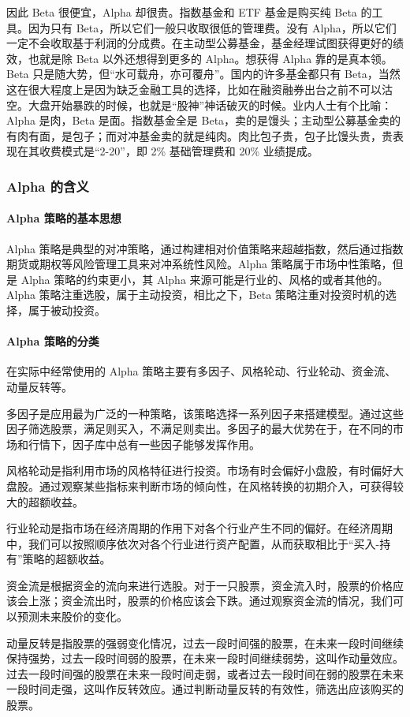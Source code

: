 因此 Beta 很便宜，Alpha 却很贵。指数基金和 ETF 基金是购买纯 Beta 的工具。因为只有 Beta，所以它们一般只收取很低的管理费。没有 Alpha，所以它们一定不会收取基于利润的分成费。在主动型公募基金，基金经理试图获得更好的绩效，也就是除 Beta 以外还想得到更多的 Alpha。想获得 Alpha 靠的是真本领。Beta 只是随大势，但“水可载舟，亦可覆舟”。国内的许多基金都只有 Beta，当然这在很大程度上是因为缺乏金融工具的选择，比如在融资融券出台之前不可以沽空。大盘开始暴跌的时候，也就是“股神”神话破灭的时候。业内人士有个比喻：Alpha 是肉，Beta 是面。指数基金全是 Beta，卖的是馒头；主动型公募基金卖的有肉有面，是包子；而对冲基金卖的就是纯肉。肉比包子贵，包子比馒头贵，贵表现在其收费模式是“2-20”，即 2\% 基础管理费和 20\% 业绩提成。
\subsubsection{Alpha 的含义}
\paragraph{Alpha 策略的基本思想} Alpha 策略是典型的对冲策略，通过构建相对价值策略来超越指数，然后通过指数期货或期权等风险管理工具来对冲系统性风险。Alpha 策略属于市场中性策略，但是 Alpha 策略的约束更小，其 Alpha 来源可能是行业的、风格的或者其他的。Alpha 策略注重选股，属于主动投资，相比之下，Beta 策略注重对投资时机的选择，属于被动投资。
\paragraph{Alpha 策略的分类} 在实际中经常使用的 Alpha 策略主要有多因子、风格轮动、行业轮动、资金流、动量反转等。

多因子是应用最为广泛的一种策略，该策略选择一系列因子来搭建模型。通过这些因子筛选股票，满足则买入，不满足则卖出。多因子的最大优势在于，在不同的市场和行情下，因子库中总有一些因子能够发挥作用。

风格轮动是指利用市场的风格特征进行投资。市场有时会偏好小盘股，有时偏好大盘股。通过观察某些指标来判断市场的倾向性，在风格转换的初期介入，可获得较大的超额收益。

行业轮动是指市场在经济周期的作用下对各个行业产生不同的偏好。在经济周期中，我们可以按照顺序依次对各个行业进行资产配置，从而获取相比于“买入-持有”策略的超额收益。

资金流是根据资金的流向来进行选股。对于一只股票，资金流入时，股票的价格应该会上涨；资金流出时，股票的价格应该会下跌。通过观察资金流的情况，我们可以预测未来股价的变化。

动量反转是指股票的强弱变化情况，过去一段时间强的股票，在未来一段时间继续保持强势，过去一段时间弱的股票，在未来一段时间继续弱势，这叫作动量效应。过去一段时间强的股票在未来一段时间走弱，或者过去一段时间在弱的股票在未来一段时间走强，这叫作反转效应。通过判断动量反转的有效性，筛选出应该购买的股票。
